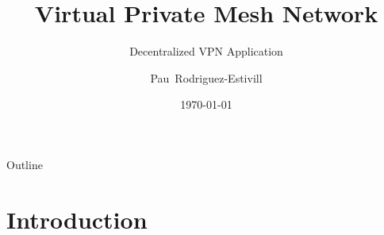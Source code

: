 \documentclass{beamer}
\title[VPMN]{Virtual Private Mesh Network} %
\subtitle{Decentralized VPN Application} %
\author{Pau~Rodriguez-Estivill}
\institute[UPC EPSC] %
{
  \it
  Director: Jos\'e Manuel Y\'ufera-G\'omez\\
  ~\\ \tiny
  Enginyeria de Telecomunicaci\'o (segon cicle)\\
  ~\\ \normalfont
  Escola Polit\`ecnica Superior de Castelldefels\\
  Universitat Polit\`ecnica de Catalunya
}
\date %
{\today}
\begin{document}
\begin{frame}
  \titlepage
\end{frame}

\begin{frame}{Outline}
  \tableofcontents
\end{frame}



\section{Introduction}
\end{document}
